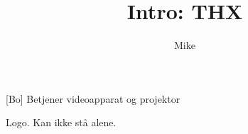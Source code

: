 \documentclass[danish]{article}
\title{Intro: THX}
\author{Mike}
\begin{document}
\maketitle

\begin{roles}
  [Bo] Betjener videoapparat og projektor
\end{roles}

\begin{sketch}

\scene Logo. Kan ikke stå alene. 

\end{sketch}
\end{document}
